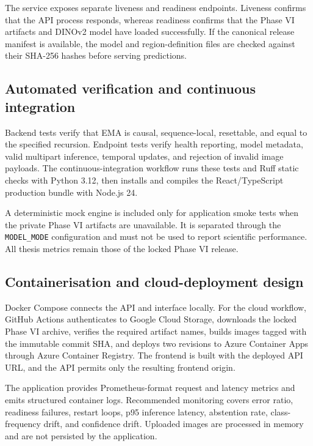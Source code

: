The service exposes separate liveness and readiness endpoints. Liveness confirms that the
API process responds, whereas readiness confirms that the Phase VI artifacts and DINOv2
model have loaded successfully. If the canonical release manifest is available, the model
and region-definition files are checked against their SHA-256 hashes before serving
predictions.

\subsection{Automated verification and continuous integration}

Backend tests verify that EMA is causal, sequence-local, resettable, and equal to the
specified recursion. Endpoint tests verify health reporting, model metadata, valid
multipart inference, temporal updates, and rejection of invalid image payloads. The
continuous-integration workflow runs these tests and Ruff static checks with Python 3.12,
then installs and compiles the React/TypeScript production bundle with Node.js 24.

A deterministic mock engine is included only for application smoke tests when the private
Phase VI artifacts are unavailable. It is separated through the \texttt{MODEL\_MODE}
configuration and must not be used to report scientific performance. All thesis metrics
remain those of the locked Phase VI release.

\subsection{Containerisation and cloud-deployment design}

Docker Compose connects the API and interface locally. For the cloud workflow, GitHub
Actions authenticates to Google Cloud Storage, downloads the locked Phase VI archive,
verifies the required artifact names, builds images tagged with the immutable commit SHA,
and deploys two revisions to Azure Container Apps through Azure Container Registry. The
frontend is built with the deployed API URL, and the API permits only the resulting frontend
origin.

The application provides Prometheus-format request and latency metrics and emits structured
container logs. Recommended monitoring covers error ratio, readiness failures, restart
loops, p95 inference latency, abstention rate, class-frequency drift, and confidence drift.
Uploaded images are processed in memory and are not persisted by the application.

